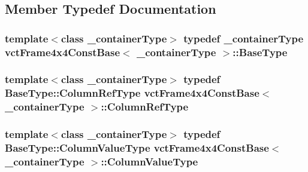 \subsection{Member Typedef Documentation}
\hypertarget{classvct_frame4x4_const_base_a586ce8ad04a54639cc8967a17fb3cd36}{}
\subsubsection[{Base\+Type}]{\setlength{\rightskip}{0pt plus 5cm}template$<$class \+\_\+container\+Type$>$ typedef \+\_\+container\+Type {\bf vct\+Frame4x4\+Const\+Base}$<$ \+\_\+container\+Type $>$\+::{\bf Base\+Type}}\label{classvct_frame4x4_const_base_a586ce8ad04a54639cc8967a17fb3cd36}
\hypertarget{classvct_frame4x4_const_base_aa62cf0655339f6cbbe4c0b4323fe8dcf}{}
\subsubsection[{Column\+Ref\+Type}]{\setlength{\rightskip}{0pt plus 5cm}template$<$class \+\_\+container\+Type$>$ typedef Base\+Type\+::\+Column\+Ref\+Type {\bf vct\+Frame4x4\+Const\+Base}$<$ \+\_\+container\+Type $>$\+::{\bf Column\+Ref\+Type}}\label{classvct_frame4x4_const_base_aa62cf0655339f6cbbe4c0b4323fe8dcf}
\hypertarget{classvct_frame4x4_const_base_a72db1f941fd40f1252409297c3dd0ff6}{}
\subsubsection[{Column\+Value\+Type}]{\setlength{\rightskip}{0pt plus 5cm}template$<$class \+\_\+container\+Type$>$ typedef Base\+Type\+::\+Column\+Value\+Type {\bf vct\+Frame4x4\+Const\+Base}$<$ \+\_\+container\+Type $>$\+::{\bf Column\+Value\+Type}}\label{classvct_frame4x4_const_base_a72db1f941fd40f1252409297c3dd0ff6}
\hypertarget{classvct_frame4x4_const_base_a12760de72da52fc0917ad17373d369f3}{}
